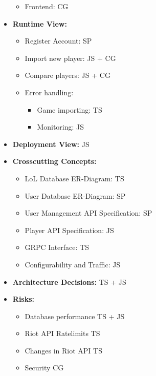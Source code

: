 \begin{itemize}
\begin{itemize}
	\item 
	Frontend: CG
\end{itemize}
\item
\textbf{Runtime View:}
\begin{itemize}
	\item
	Register Account: SP
	\item
	Import new player: JS + CG
	\item
	Compare players: JS + CG
	\item
	Error handling:
	\begin{itemize}
		\item
		Game importing: TS
		\item
		Monitoring: JS
	\end{itemize}
\end{itemize}
\item
\textbf{Deployment View:} JS
\item
\textbf{Crosscutting Concepts:}
\begin{itemize}
	\item
	LoL Database ER-Diagram: TS
	\item
	User Database ER-Diagram: SP
	\item
	User Management API Specification: SP
	\item
	Player API Specification: JS
	\item
	GRPC Interface: TS
	\item
	Configurability and Traffic: JS
\end{itemize}
\item
\textbf{Architecture Decisions:} TS + JS
\item
\textbf{Risks:}
\begin{itemize}
	\item
	Database performance TS + JS
	\item
	Riot API Ratelimits TS
	\item
	Changes in Riot API TS
	\item
	Security CG
\end{itemize}
\end{itemize}
